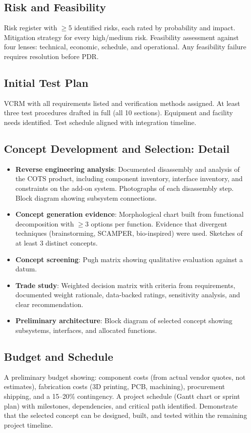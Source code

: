 \documentclass[11pt,letterpaper,twoside,openany]{book}
\begin{document}
\subsection{Risk and Feasibility}
Risk register with $\geq$5 identified risks, each rated by probability and impact. Mitigation strategy for every high/medium risk. Feasibility assessment against four lenses: technical, economic, schedule, and operational. Any feasibility failure requires resolution before PDR.

\subsection{Initial Test Plan}
VCRM with all requirements listed and verification methods assigned. At least three test procedures drafted in full (all 10 sections). Equipment and facility needs identified. Test schedule aligned with integration timeline.



\subsection{Concept Development and Selection: Detail}
\begin{itemize}[leftmargin=1.5em]
\item \textbf{Reverse engineering analysis}: Documented disassembly and analysis of the COTS product, including component inventory, interface inventory, and constraints on the add-on system. Photographs of each disassembly step. Block diagram showing subsystem connections.
\item \textbf{Concept generation evidence}: Morphological chart built from functional decomposition with $\geq$3 options per function. Evidence that divergent techniques (brainstorming, SCAMPER, bio-inspired) were used. Sketches of at least 3 distinct concepts.
\item \textbf{Concept screening}: Pugh matrix showing qualitative evaluation against a datum.
\item \textbf{Trade study}: Weighted decision matrix with criteria from requirements, documented weight rationale, data-backed ratings, sensitivity analysis, and clear recommendation.
\item \textbf{Preliminary architecture}: Block diagram of selected concept showing subsystems, interfaces, and allocated functions.
\end{itemize}

\subsection{Budget and Schedule}
A preliminary budget showing: component costs (from actual vendor quotes, not estimates), fabrication costs (3D printing, PCB, machining), procurement shipping, and a 15--20\% contingency. A project schedule (Gantt chart or sprint plan) with milestones, dependencies, and critical path identified. Demonstrate that the selected concept can be designed, built, and tested within the remaining project timeline.
\end{document}
